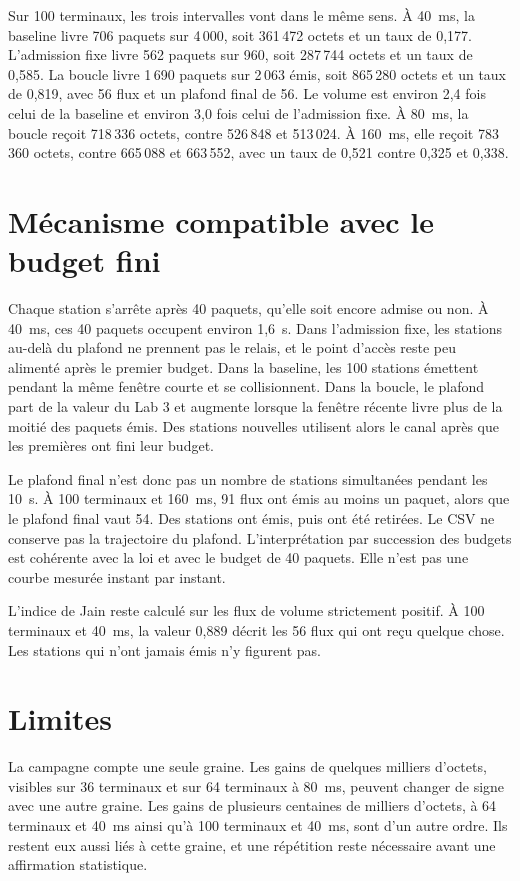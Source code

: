 \documentclass[11pt,a4paper]{article}
\begin{document}
Sur 100 terminaux, les trois intervalles vont dans le même sens. À 40~ms, la baseline livre 706 paquets sur 4\,000, soit 361\,472 octets et un taux de 0,177. L'admission fixe livre 562 paquets sur 960, soit 287\,744 octets et un taux de 0,585. La boucle livre 1\,690 paquets sur 2\,063 émis, soit 865\,280 octets et un taux de 0,819, avec 56 flux et un plafond final de 56. Le volume est environ 2,4 fois celui de la baseline et environ 3,0 fois celui de l'admission fixe. À 80~ms, la boucle reçoit 718\,336 octets, contre 526\,848 et 513\,024. À 160~ms, elle reçoit 783\,360 octets, contre 665\,088 et 663\,552, avec un taux de 0,521 contre 0,325 et 0,338.

\section{Mécanisme compatible avec le budget fini}

Chaque station s'arrête après 40 paquets, qu'elle soit encore admise ou non. À 40~ms, ces 40 paquets occupent environ 1,6~s. Dans l'admission fixe, les stations au-delà du plafond ne prennent pas le relais, et le point d'accès reste peu alimenté après le premier budget. Dans la baseline, les 100 stations émettent pendant la même fenêtre courte et se collisionnent. Dans la boucle, le plafond part de la valeur du Lab 3 et augmente lorsque la fenêtre récente livre plus de la moitié des paquets émis. Des stations nouvelles utilisent alors le canal après que les premières ont fini leur budget.

Le plafond final n'est donc pas un nombre de stations simultanées pendant les 10~s. À 100 terminaux et 160~ms, 91 flux ont émis au moins un paquet, alors que le plafond final vaut 54. Des stations ont émis, puis ont été retirées. Le CSV ne conserve pas la trajectoire du plafond. L'interprétation par succession des budgets est cohérente avec la loi et avec le budget de 40 paquets. Elle n'est pas une courbe mesurée instant par instant.

L'indice de Jain reste calculé sur les flux de volume strictement positif. À 100 terminaux et 40~ms, la valeur 0,889 décrit les 56 flux qui ont reçu quelque chose. Les stations qui n'ont jamais émis n'y figurent pas.

\section{Limites}

La campagne compte une seule graine. Les gains de quelques milliers d'octets, visibles sur 36 terminaux et sur 64 terminaux à 80~ms, peuvent changer de signe avec une autre graine. Les gains de plusieurs centaines de milliers d'octets, à 64 terminaux et 40~ms ainsi qu'à 100 terminaux et 40~ms, sont d'un autre ordre. Ils restent eux aussi liés à cette graine, et une répétition reste nécessaire avant une affirmation statistique.
\end{document}
